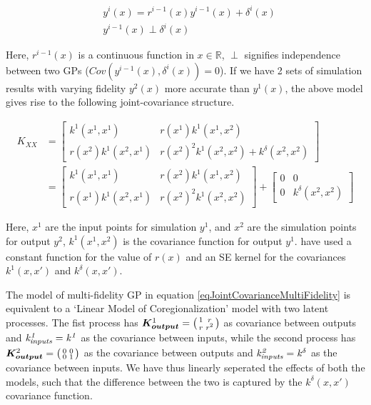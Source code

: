 \begin{align}
  & y^{i}(x) = r^{i-1}(x)y^{i-1}(x) + \delta^{i}(x) \\
  & y^{i-1}(x) \perp \delta^{i}(x)
\end{align}

Here, $r^{i-1}(x)$ is a continuous function in $x \in \mathbb{R}$, $\perp$ signifies independence between two GPs ($Cov(y^{i-1}(x), \delta^{i}(x)) = 0$). If we have 2 sets of simulation results with varying fidelity $y^{2}(x)$ more accurate than $y^{1}(x)$, the above model gives rise to the following joint-covariance structure.

\begin{equation}\label{eqJointCovarianceMultiFidelity}
         \begin{aligned}
           K_{XX}   & = \begin{bmatrix} k^{1}(x^{1}, x^{1}) & r(x^{1})k^{1}(x^{1}, x^{2})   \\
           r(x^{2})k^{1}(x^{2}, x^{1}) & r(x^{2})^2k^{1}(x^{2}, x^{2}) + k^{\delta}(x^{2}, x^{2}) \end{bmatrix} \\ 
           & = \begin{bmatrix} k^{1}(x^{1}, x^{1}) & r(x^{2})k^{1}(x^{1}, x^{2})   \\ r(x^{1})k^{1}(x^{2}, x^{1}) & r(x^{2})^2k^{1}(x^{2}, x^{2}) \end{bmatrix} 
           +  
\begin{bmatrix} 0 & 0 \\ 0 & k^{\delta}(x^{2}, x^{2}) \end{bmatrix} 
         \end{aligned}
\end{equation}

Here, $x^{1}$ are the input points for simulation $y^{1}$, and $x^{2}$ are the simulation points for output $y^{2}$, $k^{1}(x^{1}, x^{2})$ is the covariance function for output $y^{1}$. \cite{kennedy2000predicting} have used a constant function for the value of $r(x)$ and an SE kernel for the covariances $k^{1}(x, x')$ and $k^{\delta}(x, x')$. 

The model of multi-fidelity GP in equation \ref{eqJointCovarianceMultiFidelity} is equivalent to a `Linear Model of Coregionalization' model with two latent processes. The fist process has $\boldsymbol{K_{output}}^{1} = \bigl( \begin{smallmatrix} 1 & r\\ r & r^2\end{smallmatrix}\bigr)$ as covariance between outputs and $\mathit{k_{inputs}^1 = k^1}$ as the covariance between inputs, while the second process has $\boldsymbol{K_{output}}^{2} = \bigl( \begin{smallmatrix} 0 & 0\\ 0 & 1\end{smallmatrix}\bigr)$ as the covariance between outputs and $\mathit{k_{inputs}^2 = k^\delta}$ as the covariance between inputs. We have thus linearly seperated the effects of both the models, such that the difference between the two is captured by the $k^{\delta}(x, x')$ covariance function.

